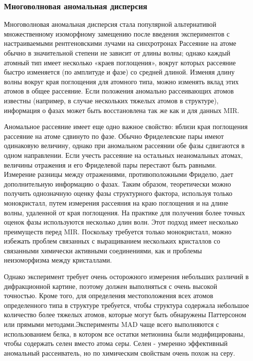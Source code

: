 \documentclass{article}
\begin{document}
\subsubsection{Многоволновая аномальная дисперсия}

Многоволновая аномальная дисперсия стала популярной альтернативой множественному изоморфному замещению после введения экспериментов с настраиваемыми рентгеновскими лучами на синхротронах\cite{Hendrickson1997}
 Рассеяние на атоме обычно в значительной степени не зависит от длины волны; однако каждый атомный тип имеет несколько «краев поглощения», вокруг которых рассеяние быстро изменяется (по амплитуде и фазе) со средней длиной. Изменяя длину волны вокруг края поглощения для атомного типа, можно изменять вклад этих атомов в общее рассеяние.  Если положения аномально рассеивающих атомов известны  (например, в случае нескольких тяжелых атомов в структуре), информация о фазах может быть восстановлена так же как и для данных MIR\cite{Hendrickson1997}.

Аномальное рассеяние имеет еще одно важное свойство: вблизи края поглощения рассеяние на атоме сдвинуто по фазе. Обычно Фриделевские пары имеют одинаковую величину, однако при аномальном рассеянии обе фазы сдвигаются в одном направлении. Если учесть рассеяние на остальных неаномальных атомах, величины отражения и его Фриделевой пары перестают быть равными. Измерение разницы между отражениями, противоположными Фриделю, дает дополнительную информацию о фазах. Таким образом, теоретически можно получить однозначную оценку фазы структурного фактора, используя только монокристалл, путем измерения рассеяния на краю поглощения и на длине волны, удаленной от края поглощения. На практике для получения более точных оценок фазы используются несколько длин волн. Этот подход имеет несколько преимуществ перед MIR. Поскольку требуется только монокристалл, можно избежать проблем связанных с выращиванием нескольких кристаллов со связанными химически активными соединениями, как и проблемы неизоморфизма между кристаллами. 

Однако эксперимент требует очень осторожного измерения небольших различий в дифракционной картине, поэтому должен выполняться с очень высокой точностью. Кроме того, для определения местоположения всех атомов определенного типа в структуре требуется, чтобы структура содержала небольшое количество более тяжелых атомов, которые могут быть обнаружены Паттерсоном или прямыми методами.Эксперименты MAD чаще всего выполняются с использованием белка, в котором все остатки метионина были модифицированы, чтобы содержать селен вместо атома серы. Селен - умеренно эффективный аномальный рассеиватель, но по химическим свойствам очень похож на серу.
\end{document}
